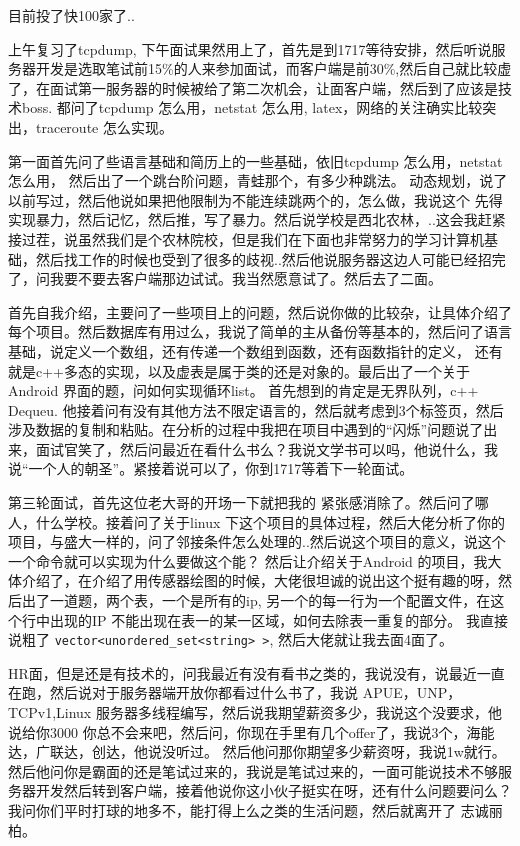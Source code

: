 \documentclass[UTF8,a4paper,8pt]{ctexart}
\begin{document}
	 	 目前投了快100家了..
	 	 
	 	 上午复习了tcpdump, 下午面试果然用上了，首先是到1717等待安排，然后听说服务器开发是选取笔试前15\%的人来参加面试，而客户端是前30\%,然后自己就比较虚了，在面试第一服务器的时候被给了第二次机会，让面客户端，然后到了应该是技术boss.
	 	 都问了tcpdump 怎么用，netstat 怎么用, latex，网络的关注确实比较突出，traceroute 怎么实现。
	 	 
	 	 第一面首先问了些语言基础和简历上的一些基础，依旧tcpdump 怎么用，netstat 怎么用， 然后出了一个跳台阶问题，青蛙那个，有多少种跳法。 动态规划，说了以前写过，然后他说如果把他限制为不能连续跳两个的，怎么做，我说这个 先得实现暴力，然后记忆，然后推，写了暴力。然后说学校是西北农林，..这会我赶紧接过茬，说虽然我们是个农林院校，但是我们在下面也非常努力的学习计算机基础，然后找工作的时候也受到了很多的歧视..然后他说服务器这边人可能已经招完了，问我要不要去客户端那边试试。我当然愿意试了。然后去了二面。
	 	 
	 	 首先自我介绍，主要问了一些项目上的问题，然后说你做的比较杂，让具体介绍了每个项目。然后数据库有用过么，我说了简单的主从备份等基本的，然后问了语言基础，说定义一个数组，还有传递一个数组到函数，还有函数指针的定义， 还有就是c++多态的实现，以及虚表是属于类的还是对象的。最后出了一个关于Android 界面的题，问如何实现循环list。 首先想到的肯定是无界队列，c++ Dequeu. 他接着问有没有其他方法不限定语言的，然后就考虑到3个标签页，然后涉及数据的复制和粘贴。在分析的过程中我把在项目中遇到的“闪烁”问题说了出来，面试官笑了，然后问最近在看什么书么？我说文学书可以吗，他说什么，我说“一个人的朝圣”。紧接着说可以了，你到1717等着下一轮面试。
	 	 
	 	 第三轮面试，首先这位老大哥的开场一下就把我的 紧张感消除了。然后问了哪人，什么学校。接着问了关于linux 下这个项目的具体过程，然后大佬分析了你的项目，与盛大一样的，问了邻接条件怎么处理的..然后说这个项目的意义，说这个一个命令就可以实现为什么要做这个能？ 然后让介绍关于Android 的项目，我大体介绍了，在介绍了用传感器绘图的时候，大佬很坦诚的说出这个挺有趣的呀，然后出了一道题，两个表，一个是所有的ip, 另一个的每一行为一个配置文件，在这个行中出现的IP 不能出现在表一的某一区域，如何去除表一重复的部分。 我直接说粗了 \verb|vector<unordered_set<string> >|, 然后大佬就让我去面4面了。
	 	 
	 	 HR面，但是还是有技术的，问我最近有没有看书之类的，我说没有，说最近一直在跑，然后说对于服务器端开放你都看过什么书了，我说 APUE，UNP，TCPv1,Linux 服务器多线程编写，然后说我期望薪资多少，我说这个没要求，他说给你3000 你总不会来吧，然后问，你现在手里有几个offer了，我说3个，海能达，广联达，创达，他说没听过。 然后他问那你期望多少薪资呀，我说1w就行。然后他问你是霸面的还是笔试过来的，我说是笔试过来的，一面可能说技术不够服务器开发然后转到客户端，接着他说你这小伙子挺实在呀，还有什么问题要问么？我问你们平时打球的地多不，能打得上么之类的生活问题，然后就离开了 志诚丽柏。
	 	 
\end{document}
